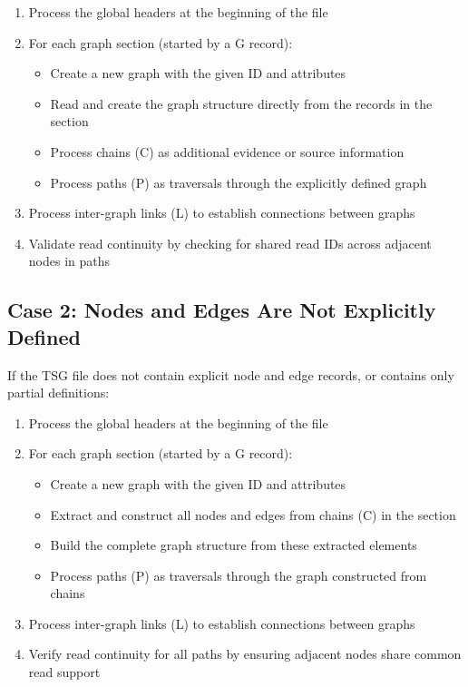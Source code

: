 \documentclass{article}
\begin{document}
\begin{enumerate}
	\item Process the global headers at the beginning of the file
	\item For each graph section (started by a G record):
	      \begin{itemize}
		      \item Create a new graph with the given ID and attributes
		      \item Read and create the graph structure directly from the records in the section
		      \item Process chains (C) as additional evidence or source information
		      \item Process paths (P) as traversals through the explicitly defined graph
	      \end{itemize}
	\item Process inter-graph links (L) to establish connections between graphs
	\item Validate read continuity by checking for shared read IDs across adjacent nodes in paths
\end{enumerate}

\subsection{Case 2: Nodes and Edges Are Not Explicitly Defined}

If the TSG file does not contain explicit node and edge records, or contains only partial definitions:

\begin{enumerate}
	\item Process the global headers at the beginning of the file
	\item For each graph section (started by a G record):
	      \begin{itemize}
		      \item Create a new graph with the given ID and attributes
		      \item Extract and construct all nodes and edges from chains (C) in the section
		      \item Build the complete graph structure from these extracted elements
		      \item Process paths (P) as traversals through the graph constructed from chains
	      \end{itemize}
	\item Process inter-graph links (L) to establish connections between graphs
	\item Verify read continuity for all paths by ensuring adjacent nodes share common read support
\end{enumerate}
\end{document}
